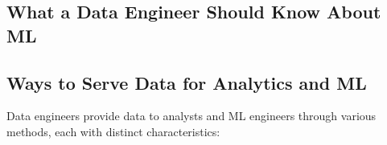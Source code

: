 \subsection{What a Data Engineer Should Know About ML}




















\subsection{Ways to Serve Data for Analytics and ML}
Data engineers provide data to analysts and ML engineers
through various methods, each with distinct characteristics:
